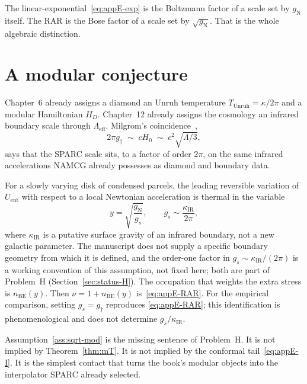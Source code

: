 The linear-exponential~\eqref{eq:appE-exp} is the Boltzmann
factor of a scale set by \(g_{\mathrm{N}}\) itself. The RAR is
the Bose factor of a scale set by \(\sqrt{g_{\mathrm{N}}}\).
That is the whole algebraic distinction.

\section{A modular conjecture}
\label{sec:appE-conj}

Chapter~6 already assigns a diamond an Unruh temperature
\(T_{\mathrm{Unruh}}=\kappa/2\pi\) and a modular Hamiltonian
\(H_D\). Chapter~12 already assigns the cosmology an infrared
boundary scale through \(\Lambda_{\mathrm{eff}}\). Milgrom's
coincidence~\cite{Milgrom1983},
\begin{equation}
  \label{eq:appE-coinc}
  2\pi g_\dagger
  \;\sim\;
  cH_0
  \;\sim\;
  c^2\sqrt{\Lambda/3},
\end{equation}
says that the SPARC scale sits, to a factor of order \(2\pi\),
on the same infrared accelerations NAMCG already possesses as
diamond and boundary data.

\begin{assumption}
  \label{ass:sqrt-mod}
  For a slowly varying disk of condensed parcels, the
  leading reversible variation of \(U_{\mathrm{ent}}\) with
  respect to a local Newtonian acceleration is thermal in
  the variable
  \begin{equation}
    \label{eq:appE-y}
    y
    =\sqrt{\frac{g_{\mathrm{N}}}{g_s}},
    \qquad
    g_s
    \sim
    \frac{\kappa_{\mathrm{IR}}}{2\pi},
  \end{equation}
  where \(\kappa_{\mathrm{IR}}\) is a putative surface gravity of an
  infrared boundary, not a new galactic parameter. The manuscript does
  not supply a specific boundary geometry from which it is defined,
  and the order-one factor in \(g_s\sim\kappa_{\mathrm{IR}}/(2\pi)\)
  is a working convention of this assumption, not fixed here; both are
  part of Problem~H (Section~\ref{sec:status-H}). The occupation that
  weights the extra stress is \(n_{\mathrm{BE}}(y)\). Then
  \(\nu=1+n_{\mathrm{BE}}(y)\) is~\eqref{eq:appE-RAR}. For the
  empirical comparison, setting \(g_s=g_\dagger\) reproduces
  \eqref{eq:appE-RAR}; this identification is phenomenological and
  does not determine \(g_s/\kappa_{\mathrm{IR}}\).
\end{assumption}

Assumption~\ref{ass:sqrt-mod} is the missing sentence of
Problem~H. It is not implied by Theorem~\ref{thm:mT}. It is
not implied by the conformal tail~\eqref{eq:appE-I}. It is
the simplest contact that turns the book's modular objects
into the interpolator SPARC already selected.

